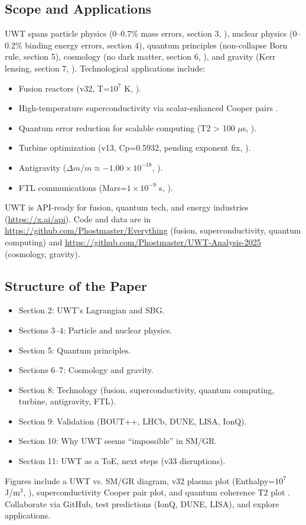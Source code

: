 \subsection{Scope and Applications}
UWT spans particle physics (0--0.7\% mass errors, section 3, \citealp{Baldwin2025Masses}), nuclear physics (0--0.2\% binding energy errors, section 4), quantum principles (non-collapse Born rule, section 5), cosmology (no dark matter, section 6, \citealp{Baldwin2025Cosmo,Baldwin2025Bullet,Baldwin2025Baryo}), and gravity (Kerr lensing, section 7, \citealp{Baldwin2025BlackHoles}). Technological applications include:
\begin{itemize}
    \item Fusion reactors (v32, T=$10^7$ K, \citealp{Baldwin2025Fusion}).
    \item High-temperature superconductivity via scalar-enhanced Cooper pairs \citep{Baldwin2025Supercond}.
    \item Quantum error reduction for scalable computing (T2 > 100 \(\mu\)s, \citealp{Baldwin2025Quantum}).
    \item Turbine optimization (v13, Cp=0.5932, pending exponent fix, \citealp{Baldwin2025Turbine}).
    \item Antigravity (\(\Delta m/m \approx -1.00 \times 10^{-18}\), \citealp{Baldwin2025FTL}).
    \item FTL communications (Mars=$1 \times 10^{-9}$ s, \citealp{Baldwin2025FTL}).
\end{itemize}
UWT is API-ready for fusion, quantum tech, and energy industries (\url{https://x.ai/api}). Code and data are in \url{https://github.com/Phostmaster/Everything} (fusion, superconductivity, quantum computing) and \url{https://github.com/Phostmaster/UWT-Analysis-2025} (cosmology, gravity).

\subsection{Structure of the Paper}
\begin{itemize}
    \item Section 2: UWT’s Lagrangian and SBG.
    \item Sections 3--4: Particle and nuclear physics.
    \item Section 5: Quantum principles.
    \item Sections 6--7: Cosmology and gravity.
    \item Section 8: Technology (fusion, superconductivity, quantum computing, turbine, antigravity, FTL).
    \item Section 9: Validation (BOUT++, LHCb, DUNE, LISA, IonQ).
    \item Section 10: Why UWT seems ``impossible'' in SM/GR.
    \item Section 11: UWT as a ToE, next steps (v33 disruptions).
\end{itemize}
Figures include a UWT vs. SM/GR diagram, v32 plasma plot (Enthalpy=$10^7$ J/m\(^3\), \citealp{Baldwin2025Fusion}), superconductivity Cooper pair plot, and quantum coherence T2 plot \citep{Baldwin2025Quantum}. Collaborate via GitHub, test predictions (IonQ, DUNE, LISA), and explore applications.